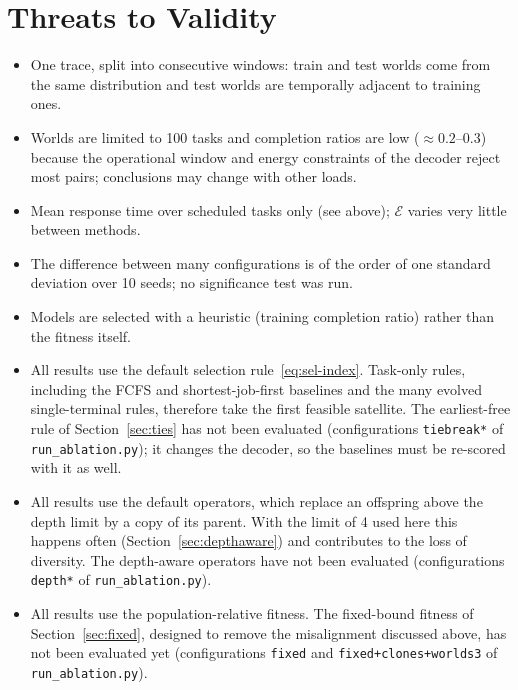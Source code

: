 \section{Threats to Validity}
\begin{itemize}
  \item One trace, split into consecutive windows: train and test worlds come from the same
        distribution and test worlds are temporally adjacent to training ones.
  \item Worlds are limited to 100 tasks and completion ratios are low
        ($\approx0.2$--$0.3$) because the operational window and energy constraints of the
        decoder reject most pairs; conclusions may change with other loads.
  \item Mean response time over scheduled tasks only (see above); $\mathcal{E}$ varies very little between methods.
  \item The difference between many configurations is of the order of one standard deviation over 10 seeds;
        no significance test was run.
  \item Models are selected with a heuristic (training completion ratio) rather than the fitness itself.
  \item All results use the default selection rule~\eqref{eq:sel-index}. Task-only rules, including
        the FCFS and shortest-job-first baselines and the many evolved single-terminal rules, therefore
        take the first feasible satellite. The earliest-free rule of Section~\ref{sec:ties} has not been
        evaluated (configurations \texttt{tiebreak*} of \texttt{run\_ablation.py}); it changes the
        decoder, so the baselines must be re-scored with it as well.
  \item All results use the default operators, which replace an offspring above the depth limit by a
        copy of its parent. With the limit of 4 used here this happens often
        (Section~\ref{sec:depthaware}) and contributes to the loss of diversity. The depth-aware
        operators have not been evaluated (configurations \texttt{depth*} of \texttt{run\_ablation.py}).
  \item All results use the population-relative fitness. The fixed-bound fitness of
        Section~\ref{sec:fixed}, designed to remove the misalignment discussed above, has not
        been evaluated yet (configurations \texttt{fixed} and \texttt{fixed+clones+worlds3} of
        \texttt{run\_ablation.py}).
\end{itemize}
